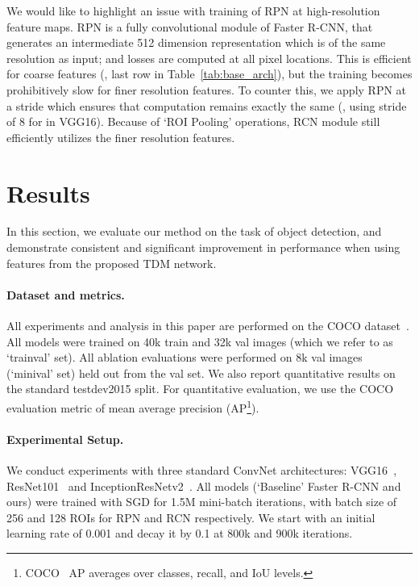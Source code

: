 \documentclass[10pt,twocolumn,letterpaper]{article}
\newcommand{\trainval}{trainval\raisebox{0.2ex}{}}
\newcommand{\minival}{minival\raisebox{0.2ex}{}}
\begin{document}
We would like to highlight an issue with training of RPN at high-resolution feature maps. RPN is a fully convolutional module of Faster R-CNN, that generates an intermediate 512 dimension representation which is of the same resolution as input; and losses are computed at all pixel locations. This is efficient for coarse features (\eg, last row in Table~\ref{tab:base_arch}), but the training becomes prohibitively slow for finer resolution features. To counter this, we apply RPN at a stride which ensures that computation remains exactly the same (\eg, using stride of 8 for  in VGG16). Because of `ROI Pooling' operations, RCN module still efficiently utilizes the finer resolution features.

\vspace{-0.01in}
\section{Results}\label{sec:results}
\vspace{-0.01in}

In this section, we evaluate our method on the task of object detection, and demonstrate consistent and significant improvement in performance when using features from the proposed TDM network.

\vspace{-0.1in}
\paragraph{Dataset and metrics.} All experiments and analysis in this paper are performed on the COCO dataset~\cite{lin2014coco}. All models were trained on 40k train and 32k val images (which we refer to as `\trainval' set). All ablation evaluations were performed on 8k val images (`\minival' set) held out from the val set. We also report quantitative results on the standard testdev2015 split. For quantitative evaluation, we use the COCO evaluation metric of mean average precision (AP\footnote{COCO~\cite{lin2014coco} AP averages over classes, recall, and IoU levels.}). 

\vspace{-0.1in}
\paragraph{Experimental Setup.} We conduct experiments with three standard ConvNet architectures: VGG16~\cite{VGG}, ResNet101~\cite{resnet} and InceptionResNetv2~\cite{szegedy2016inception}. All models (`Baseline' Faster R-CNN and ours) were trained with SGD for 1.5M mini-batch iterations, with batch size of 256 and 128 ROIs for RPN and RCN respectively. We start with an initial learning rate of 0.001 and decay it by 0.1 at 800k and 900k iterations. 
\end{document}
